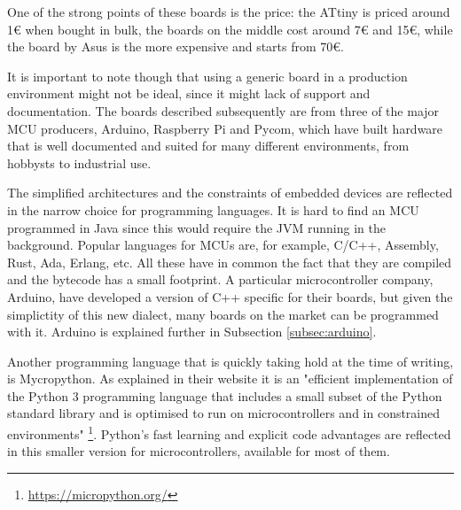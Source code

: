 		One of the strong points of these boards is the price: the ATtiny is priced around 1€ when bought in bulk, the boards on the middle cost around 7€ and 15€, while the board by Asus is the more expensive and starts from 70€.
		
		It is important to note though that using a generic board in a production environment might not be ideal, since it might lack of support and documentation.
		The boards described subsequently are from three of the major MCU producers, Arduino, Raspberry Pi and Pycom, which have built hardware that is well documented and suited for many different environments, from hobbysts to industrial use.
		
		The simplified architectures and the constraints of embedded devices are reflected in the narrow choice for programming languages.
		It is hard to find an MCU programmed in Java since this would require the JVM running in the background.
		Popular languages for MCUs are, for example, C/C++, Assembly, Rust, Ada, Erlang, etc.
		All these have in common the fact that they are compiled and the bytecode has a small footprint.
		A particular microcontroller company, Arduino, have developed a version of C++ specific for their boards, but given the simplictity of this new dialect, many boards on the market can be programmed with it.
		Arduino is explained further in Subsection \ref{subsec:arduino}.
	
		Another programming language that is quickly taking hold at the time of writing, is Mycropython.
		As explained in their website it is an "efficient implementation of the Python 3 programming language that includes a small subset of the Python standard library and is optimised to run on microcontrollers and in constrained environments" \footnote{\url{https://micropython.org/}}.
		Python's fast learning and explicit code advantages are reflected in this smaller version for microcontrollers, available for most of them.
		
